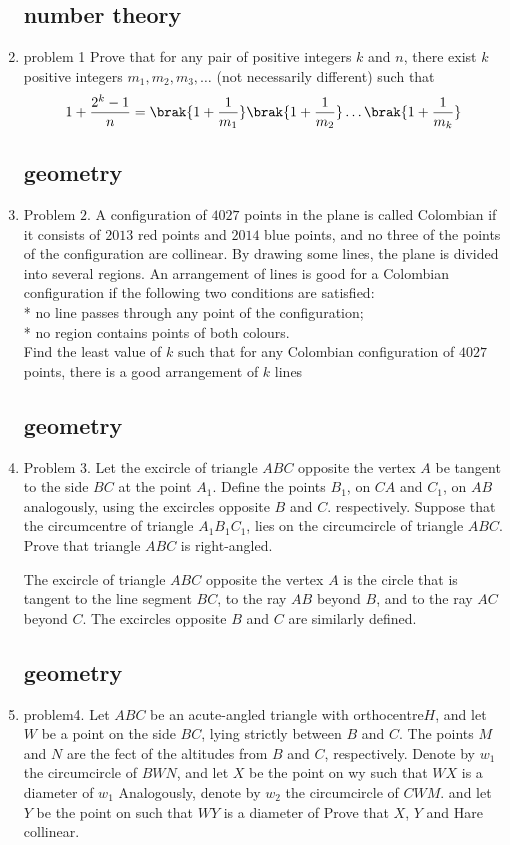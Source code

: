 \documentclass{article}
\begin{document}
\begin{enumerate}
		\subsection*{number theory}
\item problem 1 Prove that for any pair of positive integers $k$ and $n$, there exist $k$ positive integers $m_1,m_2,m_3,\ldots$
 (not necessarily different) such that
\begin{align}
	1+\frac{2^{k}-1}{n}=\brak{1+\frac{1}{m_1}}\brak{1+\frac{1}{m_2}}\ldots\brak{1+\frac{1}{m_k}}
\end{align}
		\subsection*{geometry}
\item Problem $2$. A configuration of $4027$ points in the plane is called Colombian if it consists of $2013$ red points and $2014$ blue points, and no three of the points of the configuration are collinear. By drawing some lines, the plane is divided into several regions. An arrangement of lines is good for a Colombian configuration if the following two conditions are satisfied:\\ 
 * no line passes through any point of the configuration;\\
* no region contains points of both colours.\\

Find the least value of $k$ such that for any Colombian configuration of $4027$ points, there is a good arrangement of $k$ lines
		\subsection*{geometry}

\item Problem 3. Let the excircle of triangle $ABC$ opposite the vertex $A$ be tangent to the side $BC$ at the point $A_1$. Define the points $B_1$, on $CA$ and $C_1$, on $AB$ analogously, using the excircles opposite $B$ and $C$. respectively. Suppose that the circumcentre of triangle $A_1B_1C_1$, lies on the circumcircle of triangle $ABC$. Prove that triangle $ABC$ is right-angled.

The excircle of triangle $ABC$ opposite the vertex $A$ is the circle that is tangent to the line segment $BC$, to the ray $AB$ beyond $B$, and to the ray $AC$ beyond $C$. The excircles opposite $B$ and $C$ are similarly defined.
		\subsection*{geometry}
\item problem4. Let $ABC$ be an acute-angled triangle with orthocentre$ H$, and let $W$ be a point on the side $BC$, lying strictly between $B$ and $C$. The points $M$ and $N$ are the fect of the altitudes from $B$ and $C$, respectively. Denote by $w_1$ the circumcircle of $BWN$, and let $X$ be the point on wy such that $WX$ is a diameter of $w_1$ Analogously, denote by $w_2$ the circumcircle of $CWM$. and let $Y$ be the point on such that $WY$ is a diameter of Prove that $X$, $Y$ and Hare collinear.

\end{enumerate}
\end{document}
